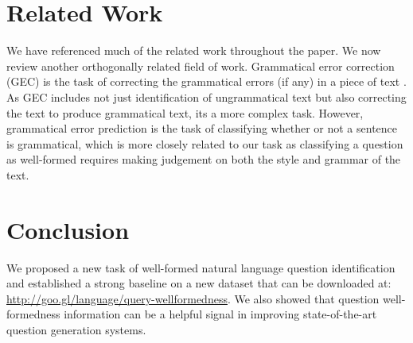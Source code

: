 \documentclass[11pt,a4paper]{article}
\begin{document}
\section{Related Work}
We have referenced much of the related work throughout the paper. We now
review another orthogonally related field of work.
Grammatical error correction (GEC) is the task of correcting the grammatical
errors (if any) in a piece of text \cite{ng2014conll}. As GEC includes not
just identification of ungrammatical text but also correcting the text to
produce grammatical text, its a more complex task. However, grammatical error
prediction \cite{schmaltz-EtAl:2016:BEA11,daudaravicius-EtAl:2016:BEA11} is the
task of classifying whether or not a sentence is grammatical, which is more closely
related to our task as classifying a question as well-formed requires making
judgement on both the style and grammar of the text.


\section{Conclusion}
We proposed a new task of well-formed natural language question identification and established a strong baseline on a new dataset that can be downloaded at: \url{http://goo.gl/language/query-wellformedness}.
We also showed that question well-formedness information can be
a helpful signal in improving state-of-the-art question generation systems.



\end{document}
